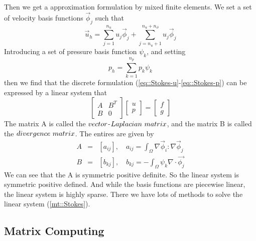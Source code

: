 \documentclass[a4paper]{article}
\begin{document}
Then we get a approximation formulation by mixed finite elements.
We set a set of velocity basis functions {$\vec{\phi}_j$} such that
\begin{equation}
\vec{u}_h = \sum^{n_u}_{j=1}u_j\vec{\phi}_j + \sum^{n_u + n_\partial}_{j=n_u+1}u_j\vec{\phi}_j
\label{eq::Stokes-u}
\end{equation}
Introducing a set of pressure basis function {$\psi_k$}, and setting
\begin{equation}
p_h = \sum^{n_p}_{k=1}p_k\psi_k
\label{eq::Stokes-p}
\end{equation}
then we find that the discrete formulation (\ref{eq::Stokes-u}-\ref{eq::Stokes-p}) can be expressed by a linear system that
\begin{equation}
\left[ \begin{array}{ccc}
A & B^T \\
B & 0
\end{array}
\right]
\left[\begin{array}{ccc}
u\\
p
\end{array}
\right]=
\left[\begin{array}{ccc}
f\\
g
\end{array}
\right]
\label{mt::Stokes}
\end{equation}
The matrix A is called the $\mathnormal{vector}$-$\mathnormal{Laplacian\ matrix}$, and the matrix B is called the $\mathnormal{divergence\ matrix}$. The entires are given by
\begin{equation}
\begin{array}{rcl}
A &=& [a_{ij}], \quad a_{ij} = \int_{\Omega} \nabla \vec{\phi}_i : \nabla \vec{\phi}_j \\
B &=& [b_{kj}], \quad b_{kj} = -\int_{\Omega} \psi_k\nabla \cdot \vec{\phi_j}
\end{array}
\end{equation}
We can see that the A is symmetric positive definite. So the linear system is symmetric positive defined. And while the basis functions are piecewise linear, the linear system is highly sparse. There we have lots of methods to solve the linear system (\ref{mt::Stokes}).\\

\subsection{Matrix Computing}
\end{document}
